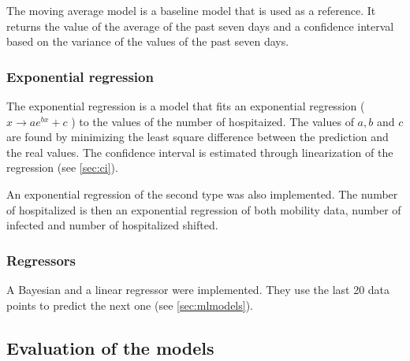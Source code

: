 The moving average model is a baseline model that is used as a reference. 
It returns the value of the average of the past seven days and a confidence interval based on the variance of the values of the past seven days. 


\subsubsection{Exponential regression}

The exponential regression is a model that fits an exponential regression ($x \rightarrow a e^{b x} + c$ ) to the values of the number of hospitaized. 
The values of $a, b$ and $c$ are found by minimizing the least square difference between the prediction and the real values. 
The confidence interval is estimated through linearization of the regression (see \ref{sec:ci}). 

An exponential regression of the second type was also implemented. 
The number of hospitalized is then an exponential regression of both mobility data, number of infected and number of hospitalized shifted. 


\subsubsection{Regressors}

A Bayesian and a linear regressor were implemented.
They use the last 20 data points to predict the next one (see \ref{sec:mlmodels}). 


\subsection{Evaluation of the models}

